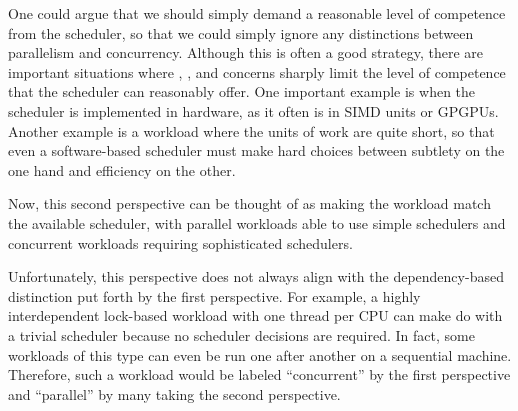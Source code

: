One could argue that we should simply demand a reasonable level of
competence from the scheduler, so that we could simply ignore any
distinctions between parallelism and concurrency.
Although this is often a good strategy,
there are important situations where ,
, and  concerns sharply limit the level
of competence that the scheduler can reasonably offer.
One important example is when the scheduler is implemented in
hardware, as it often is in SIMD units or GPGPUs.
Another example is a workload where the units of work are quite
short, so that even a software-based scheduler must make hard choices
between subtlety on the one hand and efficiency on the other.

Now, this second perspective can be thought of as making the workload
match the available scheduler, with parallel workloads able to
use simple schedulers and concurrent workloads requiring
sophisticated schedulers.

Unfortunately, this perspective does not always align with the
dependency-based distinction put forth by the first perspective.
For example, a highly interdependent lock-based workload
with one thread per CPU can make do with a trivial scheduler
because no scheduler decisions are required.
In fact, some workloads of this type can even be run one after another
on a sequential machine.
Therefore, such a workload would be labeled ``concurrent'' by the first
perspective and ``parallel'' by many taking the second perspective.

\QuickQuizEnd

